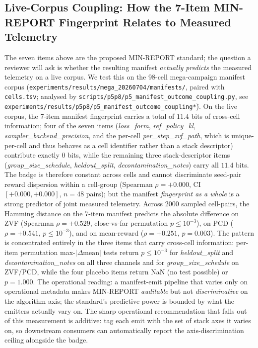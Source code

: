 \subsection{Live-Corpus Coupling: How the 7-Item MIN-REPORT Fingerprint Relates to Measured Telemetry}
\label{sec:p5-live-coupling}
The seven items above are the proposed MIN-REPORT standard; the question a
reviewer will ask is whether the resulting manifest \emph{actually predicts}
the measured telemetry on a live corpus. We test this on the
98-cell mega-campaign manifest corpus
(\texttt{experiments/results/mega\_20260704/manifests/}, paired with
\texttt{cells.tsv}; analysed by
\texttt{scripts/p5p8/p5\_manifest\_outcome\_coupling.py}, see
\texttt{experiments/results/p5p8/p5\_manifest\_outcome\_coupling\.*}). On
the live corpus, the 7-item manifest fingerprint carries a total of
$11.4$ bits of cross-cell information; four of the seven items
(\textit{loss\_form}, \textit{ref\_policy\_kl},
\textit{sampler\_backend\_precision}, and the per-cell
\textit{per\_step\_zvf\_path}, which is unique-per-cell and thus
behaves as a cell identifier rather than a stack descriptor) contribute
exactly $0$ bits, while the remaining three stack-descriptor items
(\textit{group\_size\_schedule}, \textit{heldout\_split},
\textit{decontamination\_notes}) carry all $11.4$ bits. The badge is
therefore constant across cells and cannot discriminate seed-pair
reward dispersion within a cell-group (Spearman $\rho = +0.000$, CI
$[+0.000, +0.000]$, $n=48$ pairs); but the manifest \emph{fingerprint as a
whole} is a strong predictor of joint measured telemetry. Across
$2000$ sampled cell-pairs, the Hamming distance on the 7-item manifest
predicts the absolute difference on ZVF (Spearman $\rho = +0.529$,
close-vs-far permutation $p \le 10^{-3}$), on PCD
($\rho = +0.541$, $p \le 10^{-3}$), and on mean-reward
($\rho = +0.251$, $p = 0.003$). The pattern is concentrated entirely in
the three items that carry cross-cell information: per-item permutation
max-$|\Delta\text{mean}|$ tests return $p \le 10^{-3}$ for
\textit{heldout\_split} and \textit{decontamination\_notes} on all three
channels and for \textit{group\_size\_schedule} on ZVF/PCD, while the
four placebo items return NaN (no test possible) or $p = 1.000$. The
operational reading: a manifest-emit pipeline that varies only on
operational metadata makes MIN-REPORT \emph{auditable} but not
\emph{discriminative} on the algorithm axis; the standard's predictive
power is bounded by what the emitters actually vary on. The sharp
operational recommendation that falls out of this measurement is
additive: tag each emit with the set of stack axes it varies on, so
downstream consumers can automatically report the axis-discrimination
ceiling alongside the badge.

